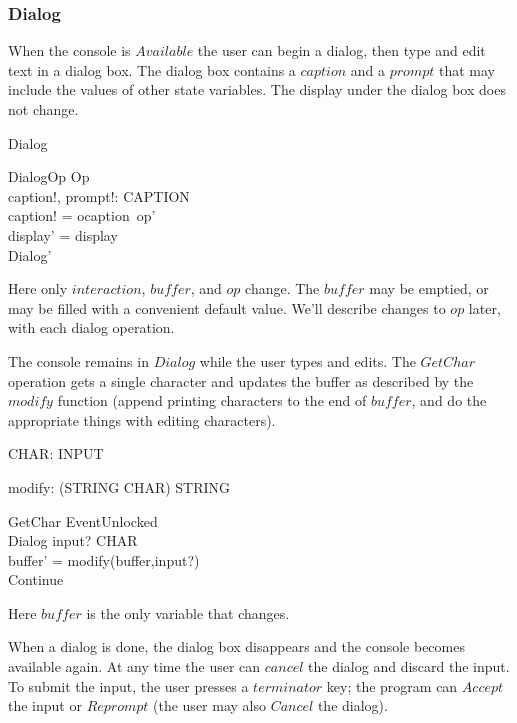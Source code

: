 \subsubsection{Dialog}

When the console is $Available$ the user can begin a dialog, then type
and edit text in a dialog box.  The dialog box contains a $caption$
and a $prompt$ that may include the values of other state variables.
The display under the dialog box does not change.

\begin{zed} Dialog  \end{zed}

\begin{schema}{DialogOp}
	Op \\
	caption!, prompt!: CAPTION \\
\where
	caption! = ocaption~op' \\
	display' = display \\
	Dialog'
\end{schema}
Here only $interaction$, $buffer$, and $op$ change.  The $buffer$ may
be emptied, or may be filled with a convenient default value.  We'll describe
changes to $op$ later, with each dialog operation.

The console remains in $Dialog$ while the user types and edits.
The $GetChar$ operation gets a single character and
updates the buffer as described by the $modify$ function (append
printing characters to the end of $buffer$, and do the appropriate
things with editing characters).

\begin{axdef}
	CHAR: \power INPUT
\end{axdef}
\begin{axdef}
	modify: (STRING \cross CHAR) \fun STRING
\end{axdef}

\begin{schema}{GetChar}
	EventUnlocked \\
	\Delta Dialog
\where
	input? \in CHAR \\
	buffer' = modify(buffer,input?) \\
	Continue 
\end{schema}
Here $buffer$ is the only variable that changes.

When a dialog is done, the dialog box disappears and the console
becomes available again. At any time the user can $cancel$ the dialog
and discard the input.  To submit the input, the user presses a
$terminator$ key; the program can $Accept$ the input or $Reprompt$
(the user may also $Cancel$ the dialog).


